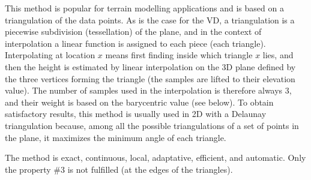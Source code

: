 This method is popular for terrain modelling applications and is based on a triangulation of the data points. 
As is the case for the VD, a triangulation is a piecewise subdivision (tessellation) of the plane, and in the context of interpolation a linear function is assigned to each piece (each triangle). 
Interpolating at location $x$ means first finding inside which triangle $x$ lies, and then the height is estimated by linear interpolation on the 3D plane defined by the three vertices forming the triangle (the samples are lifted to their elevation value). 
The number of samples used in the interpolation is therefore always 3, and their weight is based on the barycentric value (see below).
To obtain satisfactory results, this method is usually used in 2D with a Delaunay triangulation because, among all the possible triangulations of a set of points in the plane, it maximizes the minimum angle of each triangle. 

The method is exact, continuous, local, adaptative, efficient, and automatic.
Only the property \#3 is not fulfilled (at the edges of the triangles).

